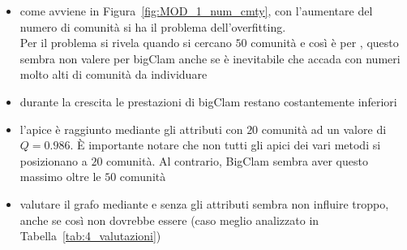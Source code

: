 \begin{itemize}
	\item come avviene in Figura~\ref{fig:MOD_1_num_cmty}, con l'aumentare del numero di comunità si ha il problema dell'overfitting.\\
	Per \citeseer il problema si rivela quando si cercano $50$ comunità e così è per \cora, questo sembra non valere per bigClam anche se è inevitabile che accada con numeri molto alti di comunità da individuare
	\item durante la crescita le prestazioni di bigClam restano costantemente inferiori
	\item l'apice è raggiunto mediante gli attributi con $20$ comunità ad un valore di $Q=0.986$. È importante notare che non tutti gli apici dei vari metodi si posizionano a $20$ comunità. Al contrario, BigClam sembra aver questo massimo oltre le $50$ comunità
	\item valutare il grafo mediante e senza gli attributi sembra non influire troppo, anche se così non dovrebbe essere (caso meglio analizzato in Tabella~\ref{tab:4_valutazioni})
\end{itemize}
%
